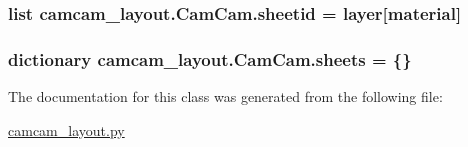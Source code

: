 \subsubsection[{sheetid}]{\setlength{\rightskip}{0pt plus 5cm}list camcam\+\_\+layout.\+Cam\+Cam.\+sheetid = {\bf layer}\mbox{[}\textquotesingle{}material\textquotesingle{}\mbox{]}\hspace{0.3cm}{\ttfamily [static]}}\label{classcamcam__layout_1_1_cam_cam_a5154c29272561706f3f08f058fe4e39d}
\hypertarget{classcamcam__layout_1_1_cam_cam_a320eacfe25d7621ee065adac1a038b79}{}
\subsubsection[{sheets}]{\setlength{\rightskip}{0pt plus 5cm}dictionary camcam\+\_\+layout.\+Cam\+Cam.\+sheets = \{\}\hspace{0.3cm}{\ttfamily [static]}}\label{classcamcam__layout_1_1_cam_cam_a320eacfe25d7621ee065adac1a038b79}


The documentation for this class was generated from the following file\+:\begin{DoxyCompactItemize}
\item 
\hyperlink{camcam__layout_8py}{camcam\+\_\+layout.\+py}\end{DoxyCompactItemize}
